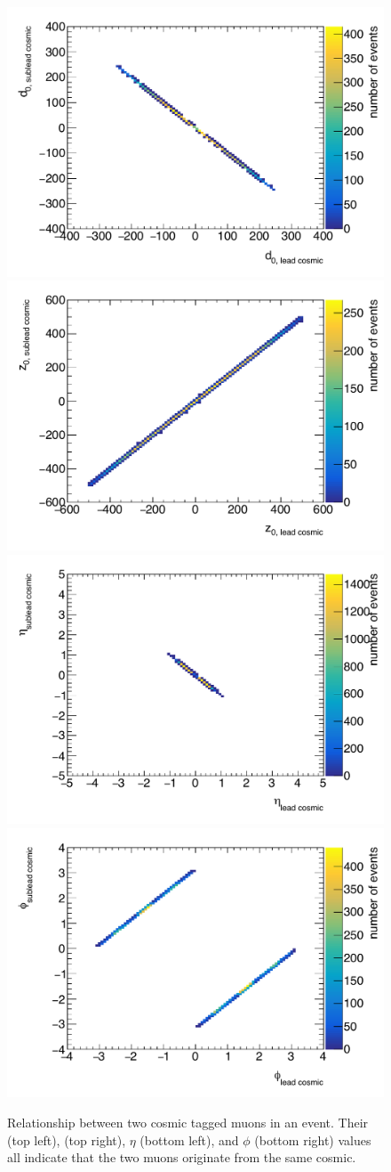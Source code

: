 \begin{figure}[!ht]
\centering
\includegraphics[width=.48\textwidth]{figures/cosmics/v4_widetag_2_2cos_d0_d0.pdf}
\includegraphics[width=.48\textwidth]{figures/cosmics/v4_widetag_2_2cos_z0_z0.pdf}
\includegraphics[width=.48\textwidth]{figures/cosmics/v4_widetag_2_2cos_eta_eta.pdf}
\includegraphics[width=.48\textwidth]{figures/cosmics/v4_widetag_2_2cos_phi_phi.pdf}
\caption{Relationship between two cosmic tagged muons in an event. Their \dz (top left), \z (top right), $\eta$ (bottom left), and $\phi$ (bottom right) values all indicate that the two muons originate from the same cosmic. }
\label{fig:2cos}
\end{figure}


